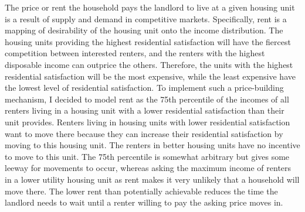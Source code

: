 The price or rent the household pays the landlord to live at a given housing unit is a result of supply and demand in competitive markets. Specifically, rent is a mapping of desirability of the housing unit onto the income distribution. The housing units providing the highest residential satisfaction will have the fiercest competition between interested renters, and the renters with the highest disposable income can outprice the others. Therefore, the units with the highest residential satisfaction will be the most expensive, while the least expensive have the lowest level of residential satisfaction. To implement such a price-building mechanism, I decided to model rent as the 75th percentile of the incomes of all renters living in a housing unit with a lower residential satisfaction than their unit provides. Renters living in housing units with lower residential satisfaction want to move there because they can increase their residential satisfaction by moving to this housing unit. The renters in better housing units have no incentive to move to this unit. The 75th percentile is somewhat arbitrary but gives some leeway for movements to occur, whereas asking the maximum income of renters in a lower utility housing unit as rent makes it very unlikely that a household will move there. The lower rent than potentially achievable reduces the time the landlord needs to wait until a renter willing to pay the asking price moves in. %